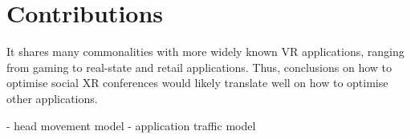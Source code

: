 \section{Contributions}
\label{sec:contributions}


It shares many commonalities with more widely known \ac{VR} applications, ranging from gaming to real-state and retail applications. Thus, conclusions on how to optimise social \ac{XR} conferences would likely translate well on how to optimise other applications. 



- head movement model
- application traffic model

